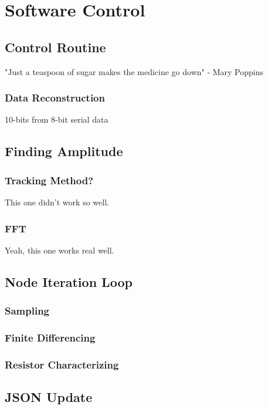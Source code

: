 \chapter{Software Control}

\section{Control Routine}

"Just a teaspoon of sugar makes the medicine go down" - Mary Poppins



\subsection{Data Reconstruction}
10-bits from 8-bit serial data

\section{Finding Amplitude}
\subsection{Tracking Method?}
This one didn't work so well.
\subsection{FFT}
Yeah, this one works real well.

\section{Node Iteration Loop}
\subsection{Sampling}
\subsection{Finite Differencing}
\subsection{Resistor Characterizing}

\section{JSON Update}

